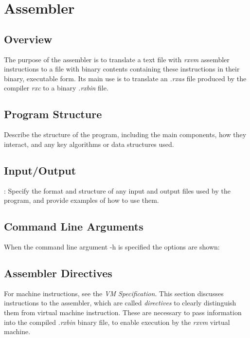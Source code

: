\chapter{\crexx{} Assembler}
\section{Overview}
The purpose of the \crexx{} assembler is to translate a text file with
\emph{rxvm} assembler instructions to a file with binary contents containing these
instructions in their binary, executable form. Its main use is to
translate an \emph{.rxas} file produced by the \crexx{} compiler
\emph{rxc} to a binary \emph{.rxbin} file.

\section{Program Structure}

 Describe the structure of the program, including the main components, how they interact, and any key algorithms or data structures used.

\section{Input/Output}

: Specify the format and structure of any input and output files used by the program, and provide examples of how to use them.

\section{Command Line Arguments}
When the command line argument -h is specified the options are shown:\\
\begin{shaded}
  \small
  \obeylines {}
 \end{shaded}
\section{Assembler Directives}
For machine instructions, see the \emph{\crexx{} VM
  Specification}. This section discusses instructions to the
assembler, which are called \emph{directives} to clearly distinguish
them from virtual machine instruction. These are necessary to pass information into the compiled
\emph{.rxbin} binary file, to enable execution by the \emph{rxvm}
virtual machine.

